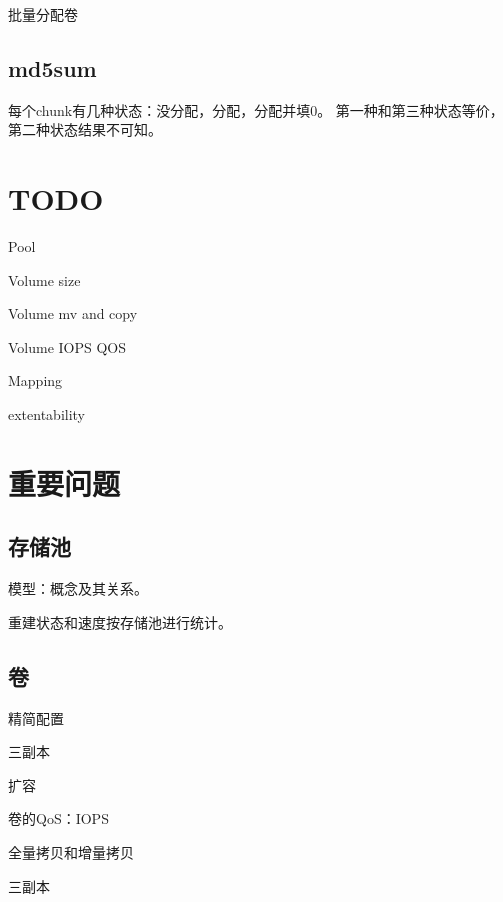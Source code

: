 批量分配卷

\subsection{md5sum}

每个chunk有几种状态：没分配，分配，分配并填0。
第一种和第三种状态等价，第二种状态结果不可知。

\section{TODO}

\begin{enumbox}
\item Pool
\item Volume size
\item Volume mv and copy
\item Volume IOPS QOS
\item Mapping
\item extentability
\end{enumbox}

\section{重要问题}

\subsection{存储池}

模型：概念及其关系。

重建状态和速度按存储池进行统计。

\subsection{卷}

\begin{enumbox}
\item 精简配置
\item 三副本
\item 扩容
\item 卷的QoS：IOPS
\item 全量拷贝和增量拷贝
\end{enumbox}

三副本 

